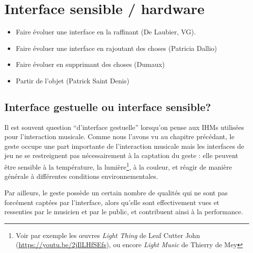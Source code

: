 %
\chapter{Interface sensible / hardware}
\label{ch:interfaces}




\vspace{-1em}
\begin{itemize}[noitemsep]
\item Faire évoluer une interface en la raffinant (De Laubier, VG).
\item Faire évoluer une interface en rajoutant des choses (Patricia Dallio)
\item Faire évoluer en supprimant des choses (Dumaux)
\item Partir de l'objet (Patrick Saint Denis)
\end{itemize}

\section{Interface gestuelle ou interface sensible?}
Il est souvent question ``d'interface gestuelle'' lorsqu'on pense aux \glspl{IHM} utilisées pour l'interaction musicale. Comme nous l'avons vu au chapitre précédant, le geste occupe une part importante de l'interaction musicale mais les interfaces de jeu ne se restreignent pas nécessairement à la captation du geste : elle peuvent être sensible à la température, la lumière\footnote{Voir par exemple les œuvres \textit{Light Thing} de Leaf Cutter John (\url{https://youtu.be/2jIlLHfSEfs}), ou encore \textit{Light Music} de Thierry de Mey}, à la couleur, et réagir de manière générale à différentes conditions environnementales.

Par ailleurs, le geste possède un certain nombre de qualités qui ne sont pas forcément captées par l'interface, alors qu'elle sont effectivement vues et ressenties par le musicien et par le public, et contribuent ainsi à la performance.

